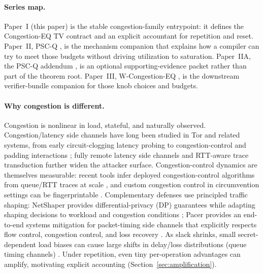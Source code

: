 \documentclass[11pt]{article}
\theoremstyle{definition}
\theoremstyle{remark}
\begin{document}
\paragraph{Series map.}
Paper~I (this paper) is the stable congestion-family entrypoint: it defines the Congestion-EQ TV contract and an explicit accountant for repetition and reset.
Paper~II, PSC-Q \cite{series:pscq}, is the mechanism companion that explains how a compiler can try to meet those budgets without driving utilization to saturation.
Paper~IIA, the PSC-Q addendum \cite{series:pscqaddendum}, is an optional supporting-evidence packet rather than part of the theorem root.
Paper~III, W-Congestion-EQ \cite{series:wcongeq}, is the downstream verifier-bundle companion for those knob choices and budgets.

\paragraph{Why congestion is different.}
Congestion is nonlinear in load, stateful, and naturally observed.
Congestion/latency side channels have long been studied in Tor and related systems, from early circuit-clogging latency probing \cite{murdoch_danezis2005,latencyleak,congestion_longpaths} to congestion-control and padding interactions \cite{defenestrator,tor324}; fully remote latency side channels \cite{snailload,zeroclicksnailload} and RTT-aware trace transduction \cite{cellshift2026} further widen the attacker surface.
Congestion-control dynamics are themselves measurable: recent tools infer deployed congestion-control algorithms from queue/RTT traces at scale \cite{nebby2024,ccanalyzer2024}, and custom congestion control in circumvention settings can be fingerprintable \cite{customcc_foci2025}.
Complementary defenses use principled traffic shaping: NetShaper provides differential-privacy (DP) guarantees while adapting shaping decisions to workload and congestion conditions \cite{netshaper2024}; Pacer provides an end-to-end systems mitigation for packet-timing side channels that explicitly respects flow control, congestion control, and loss recovery \cite{pacer2022}. 
As slack shrinks, small secret-dependent load biases can cause large shifts in delay/loss distributions (queue timing channels) \cite{bitsqueues,gong2014timing,beams2021}.
Under repetition, even tiny per-operation advantages can amplify, motivating explicit accounting (Section~\ref{sec:amplification}).
\end{document}
